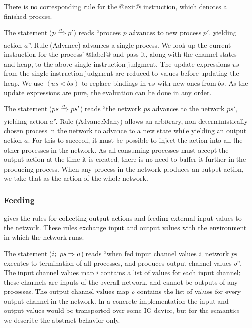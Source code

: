 There is no corresponding rule for the @exit@ instruction, which denotes a finished process.

The statement ($p \xRightarrow{a} p'$) reads ``process $p$ advances to new process $p'$, yielding action $a$''. Rule (Advance) advances a single process. We look up the current instruction for the process' @label@ and pass it, along with the channel states and heap, to the above single instruction judgment. The update expressions $us$ from the single instruction judgment are reduced to values before updating the heap. We use $(us \lhd bs)$ to replace bindings in $us$ with new ones from $bs$. As the update expressions are pure, the evaluation can be done in any order.

The statement ($ps \xRightarrow{a} ps'$) reads ``the network $ps$ advances to the network $ps'$, yielding action $a$''.
Rule (AdvanceMany) allows an arbitrary, non-deterministically chosen process in the network to advance to a new state while yielding an output action $a$.
For this to succeed, it must be possible to inject the action into all the other processes in the network.
As all consuming processes must accept the output action at the time it is created, there is no need to buffer it further in the producing process.
When any process in the network produces an output action, we take that as the action of the whole network.

\subsubsection{Feeding}
 gives the rules for collecting output actions and feeding external input values to the network.
These rules exchange input and output values with the environment in which the network runs.




The statement ($i;~ps \Rightarrow o$) reads ``when fed input channel values $i$, network $ps$ executes to termination of all processes, and produces output channel values $o$''.
The input channel values map $i$ contains a list of values for each input channel; these channels are inputs of the overall network, and cannot be outputs of any processes.
The output channel values map $o$ contains the list of values for every output channel in the network.
In a concrete implementation the input and output values would be transported over some IO device, but for the semantics we describe the abstract behavior only.


